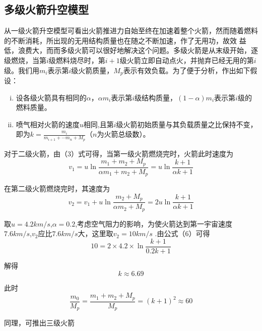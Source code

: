 \documentclass[UTF8]{ctexart}
\begin{document}
        \subsection{多级火箭升空模型}
        从一级火箭升空模型可看出火箭推进力自始至终在加速着整个火箭，然而随着燃料的不断消耗，所出现的无用结构质量也在随之不断加速，作了无用功，故效
        益低，浪费大，而而多级火箭可以很好地解决这个问题。多级火箭是从末级开始，逐级燃烧，当第$i$级燃料烧尽时，第$i+1$级火箭立即自动点火，并抛弃已经无用的第$i$级。我们用$m_i$表示第$i$级火箭质量，$M_p$表示有效负载。为了便于分析，作出如下假设：
        \begin{enumerate}[(i)]
            \item 设各级火箭具有相同的$\alpha$，$\alpha m_i$表示第$i$级结构质量，$(1-\alpha)m_i$表示第$i$级的燃料质量。
            \item 喷气相对火箭的速度$u$相同,且第$i$级火箭初始质量与其负载质量之比保持不变，即为$k =\frac{m_i}{m_{i+1}+\cdots m_n+M_p}$（$n$为火箭总级数）。
        \end{enumerate}
        \par 对于二级火箭，由（3）式可得，当第一级火箭燃烧完时，火箭此时速度为
        \begin{equation}
            v_1=u\ln \frac{m_1+m_2+M_p}{\alpha m_1+m_2+M_p}=u \ln \frac{k +1}{\alpha k+1} 
        \end{equation}
        \par 在第二级火箭燃烧完时，其速度为
        \begin{equation}
            v_2=v_1+u\ln \frac{m_2+M_p}{\alpha m_2+M_p}=2u \ln \frac{k +1}{\alpha k+1} 
        \end{equation}
        \par 取$u=4.2km/s$,$\alpha=0.2$,考虑空气阻力的影响，为使火箭达到第一宇宙速度$7.6km/s$,$v_2$应比$7.6km/s$大，这里取$v_2=10km/s$ .由公式（6）可得
        \begin{equation*}
            10=2\times4.2\times\ln \frac{k+1}{0.2k+1} 
        \end{equation*}
        \par 解得
        \begin{equation*}
            k\approx 6.69
        \end{equation*}
        \par 此时
        \begin{equation*}
            \frac{m_0}{M_p}=\frac{m_1+m_2+M_p}{M_p}= (k+1)^2\approx 60  
        \end{equation*}
        \par 同理，可推出三级火箭
\end{document}
